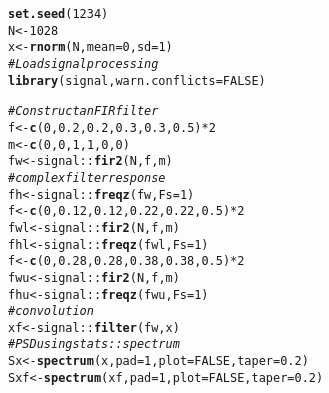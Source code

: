 \documentclass[10pt]{article}\usepackage[]{graphicx}\usepackage[]{color}
\makeatletter
\newcommand{\hlnum}[1]{\textcolor[rgb]{0.686,0.059,0.569}{#1}}%
\newcommand{\hlcom}[1]{\textcolor[rgb]{0.678,0.584,0.686}{\textit{#1}}}%
\newcommand{\hlopt}[1]{\textcolor[rgb]{0,0,0}{#1}}%
\newcommand{\hlstd}[1]{\textcolor[rgb]{0.345,0.345,0.345}{#1}}%
\newcommand{\hlkwb}[1]{\textcolor[rgb]{0.69,0.353,0.396}{#1}}%
\newcommand{\hlkwc}[1]{\textcolor[rgb]{0.333,0.667,0.333}{#1}}%
\newcommand{\hlkwd}[1]{\textcolor[rgb]{0.737,0.353,0.396}{\textbf{#1}}}%
\newenvironment{kframe}{%
 \def\at@end@of@kframe{}%
 \ifinner\ifhmode%
  \def\at@end@of@kframe{\end{minipage}}%
  \begin{minipage}{\columnwidth}%
 \fi\fi%
 \def\FrameCommand##1{\hskip\@totalleftmargin \hskip-\fboxsep
 \colorbox{shadecolor}{##1}\hskip-\fboxsep
     \hskip-\linewidth \hskip-\@totalleftmargin \hskip\columnwidth}%
 \MakeFramed {\advance\hsize-\width
   \@totalleftmargin\z@ \linewidth\hsize
   \@setminipage}}%
 {\par\unskip\endMakeFramed%
 \at@end@of@kframe}
\newenvironment{knitrout}{}{} %
\makeatother
\begin{document}
\begin{knitrout}
\color{fgcolor}\begin{kframe}
\begin{alltt}
\hlkwd{set.seed}\hlstd{(}\hlnum{1234}\hlstd{)}
\hlstd{N} \hlkwb{<-} \hlnum{1028}
\hlstd{x} \hlkwb{<-} \hlkwd{rnorm}\hlstd{(N,} \hlkwc{mean} \hlstd{=} \hlnum{0}\hlstd{,} \hlkwc{sd} \hlstd{=} \hlnum{1}\hlstd{)}
\hlcom{# Load signal processing}
\hlkwd{library}\hlstd{(signal,} \hlkwc{warn.conflicts} \hlstd{=} \hlnum{FALSE}\hlstd{)}
\end{alltt}


{\ttfamily\noindent\itshape\color{messagecolor}{\#\# Loading required package: MASS}}\begin{alltt}
\hlcom{# Construct an FIR filter}
\hlstd{f} \hlkwb{<-} \hlkwd{c}\hlstd{(}\hlnum{0}\hlstd{,} \hlnum{0.2}\hlstd{,} \hlnum{0.2}\hlstd{,} \hlnum{0.3}\hlstd{,} \hlnum{0.3}\hlstd{,} \hlnum{0.5}\hlstd{)} \hlopt{*} \hlnum{2}
\hlstd{m} \hlkwb{<-} \hlkwd{c}\hlstd{(}\hlnum{0}\hlstd{,} \hlnum{0}\hlstd{,} \hlnum{1}\hlstd{,} \hlnum{1}\hlstd{,} \hlnum{0}\hlstd{,} \hlnum{0}\hlstd{)}
\hlstd{fw} \hlkwb{<-} \hlstd{signal::}\hlkwd{fir2}\hlstd{(N, f, m)}
\hlcom{# complex filter response}
\hlstd{fh} \hlkwb{<-} \hlstd{signal::}\hlkwd{freqz}\hlstd{(fw,} \hlkwc{Fs} \hlstd{=} \hlnum{1}\hlstd{)}
\hlstd{f} \hlkwb{<-} \hlkwd{c}\hlstd{(}\hlnum{0}\hlstd{,} \hlnum{0.12}\hlstd{,} \hlnum{0.12}\hlstd{,} \hlnum{0.22}\hlstd{,} \hlnum{0.22}\hlstd{,} \hlnum{0.5}\hlstd{)} \hlopt{*} \hlnum{2}
\hlstd{fwl} \hlkwb{<-} \hlstd{signal::}\hlkwd{fir2}\hlstd{(N, f, m)}
\hlstd{fhl} \hlkwb{<-} \hlstd{signal::}\hlkwd{freqz}\hlstd{(fwl,} \hlkwc{Fs} \hlstd{=} \hlnum{1}\hlstd{)}
\hlstd{f} \hlkwb{<-} \hlkwd{c}\hlstd{(}\hlnum{0}\hlstd{,} \hlnum{0.28}\hlstd{,} \hlnum{0.28}\hlstd{,} \hlnum{0.38}\hlstd{,} \hlnum{0.38}\hlstd{,} \hlnum{0.5}\hlstd{)} \hlopt{*} \hlnum{2}
\hlstd{fwu} \hlkwb{<-} \hlstd{signal::}\hlkwd{fir2}\hlstd{(N, f, m)}
\hlstd{fhu} \hlkwb{<-} \hlstd{signal::}\hlkwd{freqz}\hlstd{(fwu,} \hlkwc{Fs} \hlstd{=} \hlnum{1}\hlstd{)}
\hlcom{# convolution}
\hlstd{xf} \hlkwb{<-} \hlstd{signal::}\hlkwd{filter}\hlstd{(fw, x)}
\hlcom{# PSD using stats::spectrum}
\hlstd{Sx} \hlkwb{<-} \hlkwd{spectrum}\hlstd{(x,} \hlkwc{pad} \hlstd{=} \hlnum{1}\hlstd{,} \hlkwc{plot} \hlstd{=} \hlnum{FALSE}\hlstd{,} \hlkwc{taper} \hlstd{=} \hlnum{0.2}\hlstd{)}
\hlstd{Sxf} \hlkwb{<-} \hlkwd{spectrum}\hlstd{(xf,} \hlkwc{pad} \hlstd{=} \hlnum{1}\hlstd{,} \hlkwc{plot} \hlstd{=} \hlnum{FALSE}\hlstd{,} \hlkwc{taper} \hlstd{=} \hlnum{0.2}\hlstd{)}
\end{alltt}
\end{kframe}
\end{knitrout}
\end{document}
